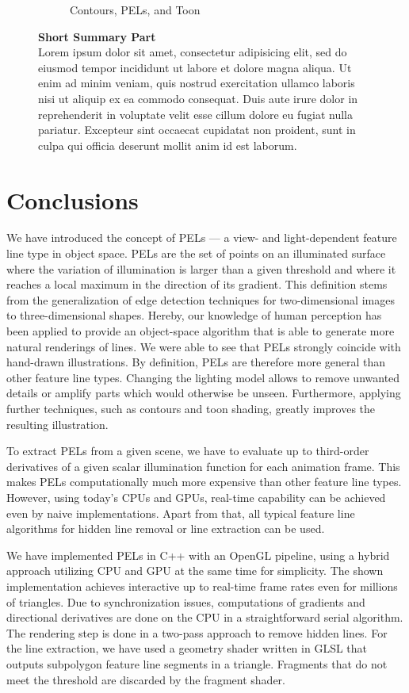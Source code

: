 \documentclass[9pt,fleqn,twoside,twocolumn]{stdglobal}
\begin{document}
\begin{figure}[h]
\begin{subfigure}[b]{0.24\textwidth}
        \caption{Contours, PELs, and Toon}
      \end{subfigure}%
      \caption{\textbf{Short Summary Part}\\
      Lorem ipsum dolor sit amet, consectetur adipisicing elit, sed do eiusmod
      tempor incididunt ut labore et dolore magna aliqua. Ut enim ad minim veniam,
      quis nostrud exercitation ullamco laboris nisi ut aliquip ex ea commodo
      consequat. Duis aute irure dolor in reprehenderit in voluptate velit esse
      cillum dolore eu fugiat nulla pariatur. Excepteur sint occaecat cupidatat non
      proident, sunt in culpa qui officia deserunt mollit anim id est laborum.}
    \end{figure}

\section{Conclusions}
  We have introduced the concept of PELs --- a view- and light-dependent feature line type in object space.
  PELs are the set of points on an illuminated surface where the variation of illumination is larger than a given threshold and where it reaches a local maximum in the direction of its gradient.
  This definition stems from the generalization of edge detection techniques for two-dimensional images to three-dimensional shapes.
  Hereby, our knowledge of human perception has been applied to provide an object-space algorithm that is able to generate more natural renderings of lines.
  We were able to see that PELs strongly coincide with hand-drawn illustrations.
  By definition, PELs are therefore more general than other feature line types.
  Changing the lighting model allows to remove unwanted details or amplify parts which would otherwise be unseen.
  Furthermore, applying further techniques, such as contours and toon shading, greatly improves the resulting illustration.

  To extract PELs from a given scene, we have to evaluate up to third-order derivatives of a given scalar illumination function for each animation frame.
  This makes PELs computationally much more expensive than other feature line types.
  However, using today's CPUs and GPUs, real-time capability can be achieved even by naive implementations.
  Apart from that, all typical feature line algorithms for hidden line removal or line extraction can be used.

  We have implemented PELs in C++ with an OpenGL pipeline, using a hybrid approach utilizing CPU and GPU at the same time for simplicity.
  The shown implementation achieves interactive up to real-time frame rates even for millions of triangles.
  Due to synchronization issues, computations of gradients and directional derivatives are done on the CPU in a straightforward serial algorithm.
  The rendering step is done in a two-pass approach to remove hidden lines.
  For the line extraction, we have used a geometry shader written in GLSL that outputs subpolygon feature line segments in a triangle.
  Fragments that do not meet the threshold are discarded by the fragment shader.
\end{document}
